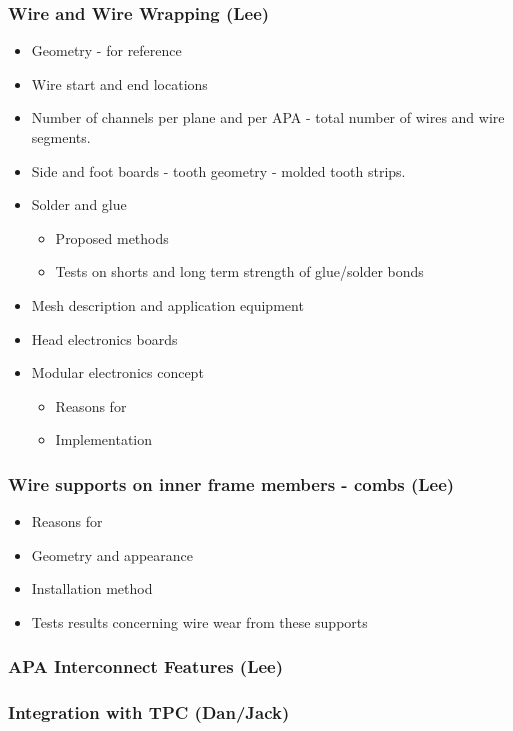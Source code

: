 \subsubsection{Wire and Wire Wrapping (Lee)}
\begin{itemize}
\item{Geometry - for reference}
\item{Wire start and end locations}
\item{Number of channels per plane and per APA - total number of wires and wire segments.}
\item{Side and foot boards - tooth geometry - molded tooth strips.}
\item{Solder and glue}
\begin{itemize}
\item{Proposed methods}
\item{Tests on shorts and long term strength of glue/solder bonds}
\end{itemize}
\item{Mesh description and application equipment}
\item{Head electronics boards}
\item{Modular electronics concept}
\begin{itemize}
\item{Reasons for}
\item{Implementation}
\end{itemize}
\end{itemize}

\subsubsection{Wire supports on inner frame members - combs (Lee)}
\begin{itemize}
\item{Reasons for}
\item{Geometry and appearance}
\item{Installation method}
\item{Tests results concerning wire wear from these supports}
\end{itemize}


\subsubsection{APA Interconnect Features (Lee)}


\subsubsection{Integration with TPC (Dan/Jack)}

